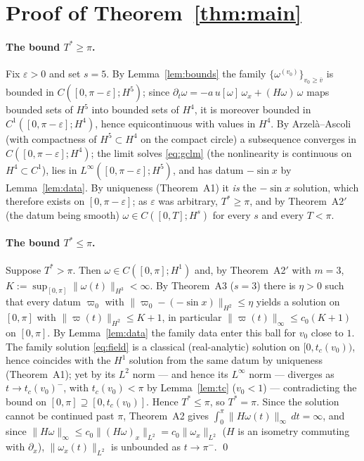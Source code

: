 \documentclass[11pt,a4paper]{article}
\theoremstyle{plain}
\theoremstyle{definition}
\theoremstyle{plain}
\newcommand{\nrm}[1]{\lVert #1 \rVert}
\begin{document}
\section{Proof of \texorpdfstring{Theorem~\ref{thm:main}}{Theorem 1}}\label{sec:proof}

\paragraph{The bound $T^*\ge\pi$.} Fix $\varepsilon>0$ and set $s=5$. By Lemma~\ref{lem:bounds} the family $\{\omega^{(v_0)}\}_{v_0\ge\bar v}$ is bounded in $C([0,\pi-\varepsilon];H^5)$; since $\partial_t\omega=-a\,u[\omega]\,\omega_x+(H\omega)\,\omega$ maps bounded sets of $H^5$ into bounded sets of $H^4$, it is moreover bounded in $C^1([0,\pi-\varepsilon];H^4)$, hence equicontinuous with values in $H^4$. By Arzel\`a--Ascoli (with compactness of $H^5\subset H^4$ on the compact circle) a subsequence converges in $C([0,\pi-\varepsilon];H^4)$; the limit solves \eqref{eq:gclm} (the nonlinearity is continuous on $H^4\subset C^1$), lies in $L^\infty([0,\pi-\varepsilon];H^5)$, and has datum $-\sin x$ by Lemma~\ref{lem:data}. By uniqueness (Theorem~A1) it \emph{is} the $-\sin x$ solution, which therefore exists on $[0,\pi-\varepsilon]$; as $\varepsilon$ was arbitrary, $T^*\ge\pi$, and by Theorem~A2$'$ (the datum being smooth) $\omega\in C([0,T];H^s)$ for every $s$ and every $T<\pi$.

\paragraph{The bound $T^*\le\pi$.} Suppose $T^*>\pi$. Then $\omega\in C([0,\pi];H^1)$ and, by Theorem~A2$'$ with $m=3$, $K:=\sup_{[0,\pi]}\nrm{\omega(t)}_{H^3}<\infty$. By Theorem~A3 ($s=3$) there is $\eta>0$ such that every datum $\varpi_0$ with $\nrm{\varpi_0-(-\sin x)}_{H^2}\le\eta$ yields a solution on $[0,\pi]$ with $\nrm{\varpi(t)}_{H^2}\le K+1$, in particular $\nrm{\varpi(t)}_\infty\le c_0(K+1)$ on $[0,\pi]$. By Lemma~\ref{lem:data} the family data enter this ball for $v_0$ close to $1$. The family solution \eqref{eq:field} is a classical (real-analytic) solution on $[0,t_c(v_0))$, hence coincides with the $H^1$ solution from the same datum by uniqueness (Theorem~A1); yet by \cite[Theorem~3.7]{SLSA25} its $L^2$ norm --- and hence its $L^\infty$ norm --- diverges as $t\to t_c(v_0)^-$, with $t_c(v_0)<\pi$ by Lemma~\ref{lem:tc} ($v_0<1$) --- contradicting the bound on $[0,\pi]\supseteq[0,t_c(v_0)]$. Hence $T^*\le\pi$, so $T^*=\pi$. Since the solution cannot be continued past $\pi$, Theorem~A2 gives $\int_0^\pi\nrm{H\omega(t)}_\infty\,dt=\infty$, and since $\nrm{H\omega}_\infty\le c_0\nrm{(H\omega)_x}_{L^2}=c_0\nrm{\omega_x}_{L^2}$ ($H$ is an isometry commuting with $\partial_x$), $\nrm{\omega_x(t)}_{L^2}$ is unbounded as $t\to\pi^-$. \qed
\end{document}
